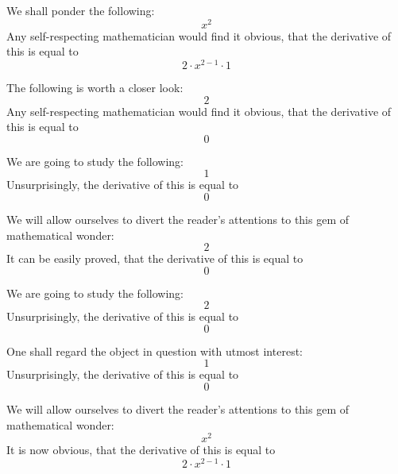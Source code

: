 \documentclass{article}
\begin{document}
We shall ponder the following:
\begin{equation}
x ^{2 } 
\end{equation}
Any self-respecting mathematician would find it obvious, that the derivative of this is equal to
\begin{equation}
2 \cdot x ^{2 - 1 } \cdot 1 
\end{equation}

The following is worth a closer look:
\begin{equation}
2 
\end{equation}
Any self-respecting mathematician would find it obvious, that the derivative of this is equal to
\begin{equation}
0 
\end{equation}

We are going to study the following:
\begin{equation}
1 
\end{equation}
Unsurprisingly, the derivative of this is equal to
\begin{equation}
0 
\end{equation}

We will allow ourselves to divert the reader's attentions to this gem of mathematical wonder:
\begin{equation}
2 
\end{equation}
It can be easily proved, that the derivative of this is equal to
\begin{equation}
0 
\end{equation}

We are going to study the following:
\begin{equation}
2 
\end{equation}
Unsurprisingly, the derivative of this is equal to
\begin{equation}
0 
\end{equation}

One shall regard the object in question with utmost interest:
\begin{equation}
1 
\end{equation}
Unsurprisingly, the derivative of this is equal to
\begin{equation}
0 
\end{equation}

We will allow ourselves to divert the reader's attentions to this gem of mathematical wonder:
\begin{equation}
x ^{2 } 
\end{equation}
It is now obvious, that the derivative of this is equal to
\begin{equation}
2 \cdot x ^{2 - 1 } \cdot 1 
\end{equation}
\end{document}
